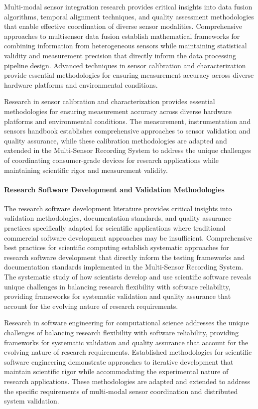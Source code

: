 \documentclass[12pt,a4paper]{report}
\begin{document}
Multi-modal sensor integration research provides critical insights into data fusion algorithms, temporal alignment
techniques, and quality assessment methodologies that enable effective coordination of diverse sensor modalities.
Comprehensive approaches to multisensor data fusion establish mathematical frameworks for combining information from
heterogeneous sensors while maintaining statistical validity and measurement precision that directly inform the data
processing pipeline design. Advanced techniques in sensor calibration and characterization provide essential
methodologies for ensuring measurement accuracy across diverse hardware platforms and environmental conditions.

Research in sensor calibration and characterization provides essential methodologies for ensuring measurement accuracy
across diverse hardware platforms and environmental conditions. The measurement, instrumentation and sensors handbook
establishes comprehensive approaches to sensor validation and quality assurance, while these calibration methodologies
are adapted and extended in the Multi-Sensor Recording System to address the unique challenges of coordinating
consumer-grade devices for research applications while maintaining scientific rigor and measurement validity.

\paragraph{Research Software Development and Validation Methodologies}

The research software development literature provides critical insights into validation methodologies, documentation
standards, and quality assurance practices specifically adapted for scientific applications where traditional commercial
software development approaches may be insufficient. Comprehensive best practices for scientific computing establish
systematic approaches for research software development that directly inform the testing frameworks and documentation
standards implemented in the Multi-Sensor Recording System. The systematic study of how scientists develop and use
scientific software reveals unique challenges in balancing research flexibility with software reliability, providing
frameworks for systematic validation and quality assurance that account for the evolving nature of research
requirements.

Research in software engineering for computational science addresses the unique challenges of balancing research
flexibility with software reliability, providing frameworks for systematic validation and quality assurance that account
for the evolving nature of research requirements. Established methodologies for scientific software engineering
demonstrate approaches to iterative development that maintain scientific rigor while accommodating the experimental
nature of research applications. These methodologies are adapted and extended to address the specific requirements of
multi-modal sensor coordination and distributed system validation.
\end{document}
